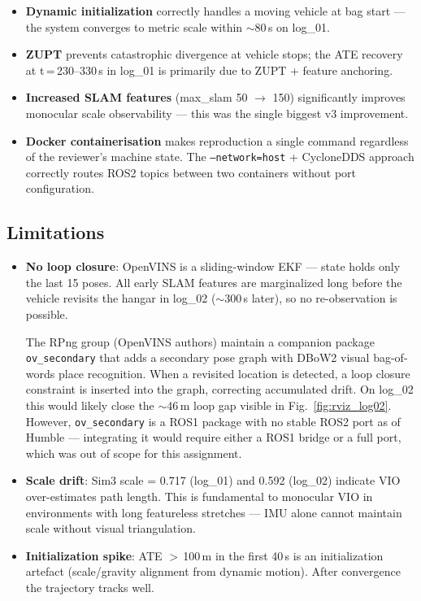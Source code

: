 \documentclass[10pt,a4paper]{article}
\begin{document}
\begin{itemize}[nosep]
  \item \textbf{Dynamic initialization} correctly handles a moving vehicle at bag start ---
    the system converges to metric scale within $\sim$80\,s on log\_01.
  \item \textbf{ZUPT} prevents catastrophic divergence at vehicle stops; the ATE recovery
    at t\,=\,230--330\,s in log\_01 is primarily due to ZUPT + feature anchoring.
  \item \textbf{Increased SLAM features} (max\_slam 50 $\to$ 150) significantly improves
    monocular scale observability --- this was the single biggest v3 improvement.
  \item \textbf{Docker containerisation} makes reproduction a single command regardless of
    the reviewer's machine state. The \texttt{--network=host} + CycloneDDS approach correctly
    routes ROS2 topics between two containers without port configuration.
\end{itemize}

\subsection{Limitations}

\begin{itemize}[nosep]
  \item \textbf{No loop closure}: OpenVINS is a sliding-window EKF --- state holds only the
    last 15 poses. All early SLAM features are marginalized long before the vehicle revisits
    the hangar in log\_02 ($\sim$300\,s later), so no re-observation is possible.

    The RPng group (OpenVINS authors) maintain a companion package \texttt{ov\_secondary}
    that adds a secondary pose graph with DBoW2 visual bag-of-words place recognition.
    When a revisited location is detected, a loop closure constraint is inserted into the
    graph, correcting accumulated drift. On log\_02 this would likely close the
    $\sim$46\,m loop gap visible in Fig.~\ref{fig:rviz_log02}. However,
    \texttt{ov\_secondary} is a ROS1 package with no stable ROS2 port as of Humble ---
    integrating it would require either a ROS1 bridge or a full port, which was out of
    scope for this assignment.
  \item \textbf{Scale drift}: Sim3 scale = 0.717 (log\_01) and 0.592 (log\_02) indicate
    VIO over-estimates path length. This is fundamental to monocular VIO in environments
    with long featureless stretches --- IMU alone cannot maintain scale without visual
    triangulation.
  \item \textbf{Initialization spike}: ATE $>$\,100\,m in the first 40\,s is an
    initialization artefact (scale/gravity alignment from dynamic motion). After convergence
    the trajectory tracks well.
\end{itemize}
\end{document}
